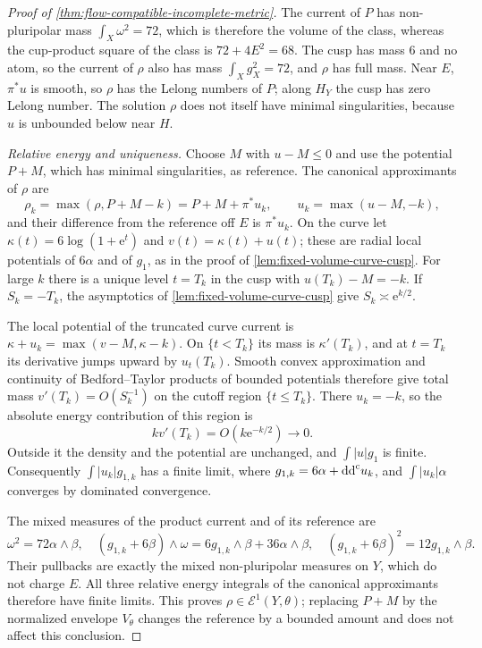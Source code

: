 \begin{proof}[Proof of \cref{thm:flow-compatible-incomplete-metric}]
The current of $P$ has non-pluripolar mass $\int_X\omega^2=72$, which is therefore the volume of the class, whereas the cup-product square of the class is $72+4E^2=68$. The cusp has mass $6$ and no atom, so the current of $\rho$ also has mass $\int_Xg_X^2=72$, and $\rho$ has full mass. Near $E$, $\pi^*u$ is smooth, so $\rho$ has the Lelong numbers of $P$; along $H_Y$ the cusp has zero Lelong number. The solution $\rho$ does not itself have minimal singularities, because $u$ is unbounded below near $H$.

\emph{Relative energy and uniqueness.}
Choose $M$ with $u-M\leq0$ and use the potential $P+M$, which has minimal singularities, as reference. The canonical approximants of $\rho$ are
\[
 \rho_k=\max(\rho,P+M-k)=P+M+\pi^*u_k,\qquad u_k=\max(u-M,-k),
\]
and their difference from the reference off $E$ is $\pi^*u_k$. On the curve let $\kappa(t)=6\log(1+\mathrm{e}^t)$ and $v(t)=\kappa(t)+u(t)$; these are radial local potentials of $6\alpha$ and of $g_1$, as in the proof of \cref{lem:fixed-volume-curve-cusp}. For large $k$ there is a unique level $t=T_k$ in the cusp with $u(T_k)-M=-k$. If $S_k=-T_k$, the asymptotics of \cref{lem:fixed-volume-curve-cusp} give $S_k\asymp\mathrm{e}^{k/2}$.

The local potential of the truncated curve current is $\kappa+u_k=\max(v-M,\kappa-k)$. On $\{t<T_k\}$ its mass is $\kappa'(T_k)$, and at $t=T_k$ its derivative jumps upward by $u_t(T_k)$. Smooth convex approximation and continuity of Bedford--Taylor products of bounded potentials therefore give total mass $v'(T_k)=O(S_k^{-1})$ on the cutoff region $\{t\leq T_k\}$. There $u_k=-k$, so the absolute energy contribution of this region is
\[
 kv'(T_k)=O(k\mathrm{e}^{-k/2})\longrightarrow0.
\]
Outside it the density and the potential are unchanged, and $\int|u|g_1$ is finite. Consequently $\int|u_k|g_{1,k}$ has a finite limit, where $g_{1,k}=6\alpha+\mathrm{dd}^{\mathrm{c}} u_k$, and $\int|u_k|\alpha$ converges by dominated convergence.

The mixed measures of the product current and of its reference are
\[
 \omega^2=72\alpha\wedge\beta,\quad
 (g_{1,k}+6\beta)\wedge\omega
     =6g_{1,k}\wedge\beta+36\alpha\wedge\beta,\quad
 (g_{1,k}+6\beta)^2=12g_{1,k}\wedge\beta.
\]
Their pullbacks are exactly the mixed non-pluripolar measures on $Y$, which do not charge $E$. All three relative energy integrals of the canonical approximants therefore have finite limits. This proves $\rho\in\mathcal E^1(Y,\theta)$; replacing $P+M$ by the normalized envelope $V_\theta$ changes the reference by a bounded amount and does not affect this conclusion.


\end{proof}
